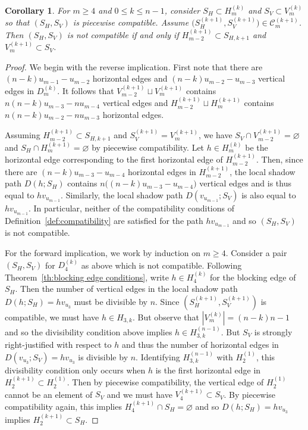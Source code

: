 \documentclass{amsart}
\newtheorem{corollary}[theorem]{Corollary}
\newcommand{\cC}{\mathcal{C}}
\begin{document}
\begin{corollary}
  For $m\ge4$ and $0\le k\le n-1$, consider $S_H\subset H_m^{(k)}$ and $S_V\subset V_m^{(k)}$ so that $(S_H,S_V)$ is piecewise compatible.
  Assume $\big(S_H^{(k+1)},S_V^{(k+1)}\big)\in\cC_m^{(k+1)}$.
  Then $(S_H,S_V)$ is not compatible if and only if $H_{m-2}^{(k+1)}\subset S_{H,k+1}$ and $V_m^{(k+1)}\subset S_V$.
\end{corollary}
\begin{proof}
  We begin with the reverse implication.
  First note that there are $(n-k)u_{m-1}-u_{m-2}$ horizontal edges and $(n-k)u_{m-2}-u_{m-3}$ vertical edges in $D_m^{(k)}$. 
  It follows that $V_{m-2}^{(k+1)}\sqcup V_m^{(k+1)}$ contains $n(n-k)u_{m-3}-nu_{m-4}$ vertical edges and $H_{m-2}^{(k+1)}\sqcup H_m^{(k+1)}$ contains $n(n-k)u_{m-2}-nu_{m-3}$ horizontal edges.

  Assuming $H_{m-2}^{(k+1)}\subset S_{H,k+1}$ and $S_V^{(k+1)}=V_m^{(k+1)}$, we have $S_V\cap V_{m-2}^{(k+1)}=\varnothing$ and $S_H\cap H_m^{(k+1)}=\varnothing$ by piecewise compatibility.
  Let $h\in H_m^{(k)}$ be the horizontal edge corresponding to the first horizontal edge of $H_{m-2}^{(k+1)}$.
  Then, since there are $(n-k)u_{m-3}-u_{m-4}$ horizontal edges in $H_{m-2}^{(k+1)}$, the local shadow path $D(h;S_H)$ contains $n\big((n-k)u_{m-3}-u_{m-4}\big)$ vertical edges and is thus equal to $hv_{u_{m-1}}$.
  Similarly, the local shadow path $D(v_{u_{m-1}};S_V)$ is also equal to $hv_{u_{m-1}}$.
  In particular, neither of the compatibility conditions of Definition~\ref{def:compatibility} are satisfied for the path $hv_{u_{m-1}}$ and so $(S_H,S_V)$ is not compatible.

  For the forward implication, we work by induction on $m\ge4$.
  Consider a pair $(S_H,S_V)$ for $D_4^{(k)}$ as above which is not compatible.
  Following Theorem~\ref{th:blocking edge conditions}, write $h\in H_4^{(k)}$ for the blocking edge of $S_H$.
  Then the number of vertical edges in the local shadow path $D(h;S_H)=hv_{u_3}$ must be divisible by $n$. 
  Since $(S_H^{(k+1)},S_V^{(k+1)})$ is compatible, we must have $h\in H_{3,k}$.
  But observe that $|V_m^{(k)}|=(n-k)n-1$ and so the divisibility condition above implies $h\in H_{3,k}^{(n-1)}$.
  But $S_V$ is strongly right-justified with respect to $h$ and thus the number of horizontal edges in $D(v_{u_3};S_V)=hv_{u_3}$ is divisible by $n$.
  Identifying $H_{3,k}^{(n-1)}$ with $H_2^{(1)}$, this divisibility condition only occurs when $h$ is the first horizontal edge in $H_2^{(k+1)}\subset H_2^{(1)}$.
  Then by piecewise compatibility, the vertical edge of $H_2^{(1)}$ cannot be an element of $S_V$ and we must have $V_4^{(k+1)}\subset S_V$.
  By piecewise compatibility again, this implies $H_4^{(k+1)}\cap S_H=\varnothing$ and so $D(h;S_H)=hv_{u_3}$ implies $H_2^{(k+1)}\subset S_H$.


\end{proof}
\end{document}
